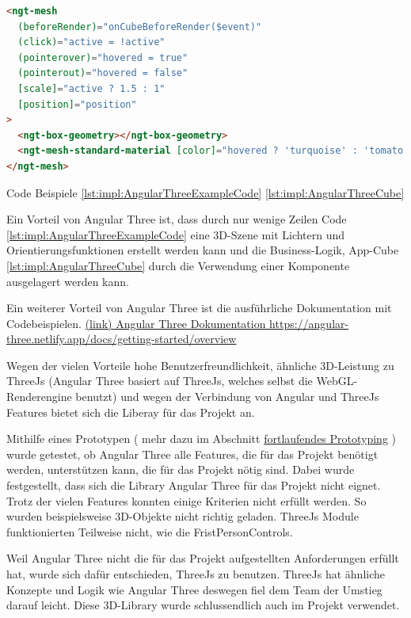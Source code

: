 \begin{lstlisting}[language=html,caption=Angular Three - App Cube,label=lst:impl:AngularThreeCube]
<ngt-mesh
  (beforeRender)="onCubeBeforeRender($event)"
  (click)="active = !active"
  (pointerover)="hovered = true"
  (pointerout)="hovered = false"
  [scale]="active ? 1.5 : 1"
  [position]="position"
>
  <ngt-box-geometry></ngt-box-geometry>
  <ngt-mesh-standard-material [color]="hovered ? 'turquoise' : 'tomato'"></ngt-mesh-standard-material>
</ngt-mesh>
\end{lstlisting}

Code Beispiele \ref{lst:impl:AngularThreeExampleCode} \ref{lst:impl:AngularThreeCube} \cite{AngularThreeDocumentationFirstScene}

Ein Vorteil von Angular Three ist, dass durch nur wenige Zeilen Code \ref{lst:impl:AngularThreeExampleCode} eine 3D-Szene mit Lichtern und Orientierungsfunktionen erstellt werden kann und die Business-Logik, App-Cube \ref{lst:impl:AngularThreeCube} durch die Verwendung einer Komponente ausgelagert werden kann.

Ein weiterer Vorteil von Angular Three ist die ausführliche Dokumentation mit Codebeispielen. \href{https://angular-three.netlify.app/docs/getting-started/overview}{(link) Angular Three Dokumentation https://angular-three.netlify.app/docs/getting-started/overview}

Wegen der vielen Vorteile hohe Benutzerfreundlichkeit, ähnliche 3D-Leistung zu ThreeJs (Angular Three basiert auf ThreeJs, welches selbst die WebGL-Renderengine benutzt) und wegen der Verbindung von Angular und ThreeJs Features bietet sich die Liberay für das Projekt an.

Mithilfe eines Prototypen ( mehr dazu im Abschnitt \hyperref[ch::ongoing-prototyping]{fortlaufendes Prototyping} ) wurde getestet, ob Angular Three alle Features, die für das Projekt benötigt werden, unterstützen kann, die für das Projekt nötig sind. Dabei wurde festgestellt, dass sich die Library Angular Three für das Projekt nicht eignet. Trotz der vielen Features konnten einige Kriterien nicht erfüllt werden. So wurden beispielsweise 3D-Objekte nicht richtig geladen. ThreeJs Module funktionierten Teilweise nicht, wie die FristPersonControls. 

Weil Angular Three nicht die für das Projekt aufgestellten Anforderungen erfüllt hat, wurde sich dafür entschieden, ThreeJs zu benutzen. ThreeJs hat ähnliche Konzepte und Logik wie Angular Three deswegen fiel dem Team der Umstieg darauf leicht. Diese 3D-Library wurde schlussendlich auch im Projekt verwendet.

